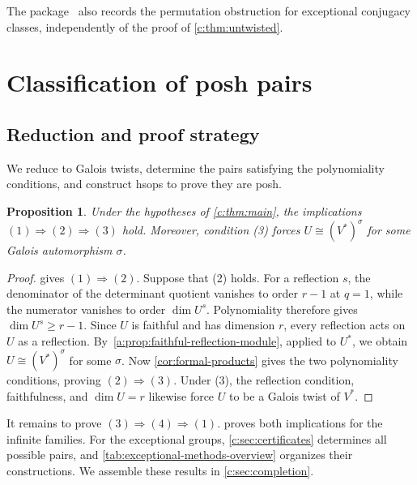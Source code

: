 \documentclass[10pt,a4paper]{amsart}
\newtheorem{proposition}[theorem]{Proposition}
\theoremstyle{definition}
\begin{document}
The package~\cite{Computations} also records the permutation obstruction
for exceptional conjugacy classes, independently of the proof of
\cref{c:thm:untwisted}.


\section{Classification of posh pairs}\label{sec:proof-algebraic}\label{sec:computations}

\subsection{Reduction and proof strategy}\label{c:sec:reduction}

We reduce to Galois twists, determine the pairs satisfying the
polynomiality conditions, and construct hsops to prove they are posh.

\classificationtheorem*

\begin{proposition}\label{c:prop:reduction}
Under the hypotheses of \cref{c:thm:main}, the implications
$(1)\Rightarrow(2)\Rightarrow(3)$ hold. Moreover, condition (3) forces
$U\cong(V^*)^\sigma$ for some Galois automorphism $\sigma$.
\end{proposition}

\begin{proof}
 gives $(1)\Rightarrow(2)$.
Suppose that (2) holds. For a reflection $s$, the denominator of the
determinant quotient vanishes to order $r-1$ at $q=1$, while the
numerator vanishes to order $\dim U^s$. Polynomiality therefore gives
$\dim U^s\geq r-1$. Since $U$ is faithful and has dimension $r$,
every reflection acts on $U$ as a reflection.
By~\cref{a:prop:faithful-reflection-module}, applied to $U^*$,
we obtain $U\cong(V^*)^\sigma$ for some $\sigma$.
Now \cref{cor:formal-products} gives the two polynomiality conditions,
proving $(2)\Rightarrow(3)$.
Under (3), the reflection condition, faithfulness, and
$\dim U=r$ likewise force $U$ to be a Galois twist of $V^*$.
\end{proof}

It remains to prove $(3)\Rightarrow(4)\Rightarrow(1)$.
 proves both implications for the infinite
families. For the exceptional groups,
\cref{c:sec:certificates} determines all possible pairs, and
\cref{tab:exceptional-methods-overview} organizes their constructions.
We assemble these results in \cref{c:sec:completion}.
\end{document}
